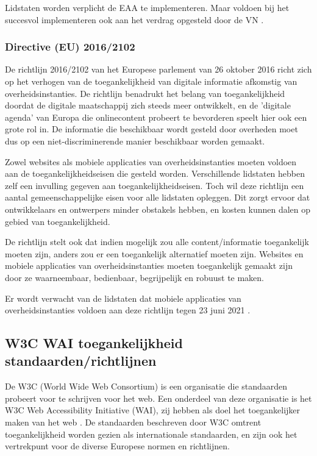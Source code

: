 Lidstaten worden verplicht de EAA te implementeren. Maar voldoen bij het succesvol implementeren ook aan het verdrag opgesteld door de VN \autocite{eaa2015}.



\subsubsection{Directive (EU) 2016/2102}
De richtlijn 2016/2102 van het Europese parlement van 26 oktober 2016 richt zich op het verhogen van de toegankelijkheid van digitale informatie afkomstig van overheidsinstanties. De richtlijn benadrukt het belang van toegankelijkheid doordat de digitale maatschappij zich steeds meer ontwikkelt, en de 'digitale agenda' van Europa die onlinecontent probeert te bevorderen speelt hier ook een grote rol in. De informatie die beschikbaar wordt gesteld door overheden moet dus op een niet-discriminerende manier beschikbaar worden gemaakt. 

Zowel websites als mobiele applicaties van overheidsinstanties moeten voldoen aan de toegankelijkheidseisen die gesteld worden. Verschillende lidstaten hebben zelf een invulling gegeven aan toegankelijkheidseisen. Toch wil deze richtlijn een aantal gemeenschappelijke eisen voor alle lidstaten opleggen. Dit zorgt ervoor dat ontwikkelaars en ontwerpers minder obstakels hebben, en kosten kunnen dalen op gebied van toegankelijkheid.

De richtlijn stelt ook dat indien mogelijk zou alle content/informatie toegankelijk moeten zijn, anders zou er een toegankelijk alternatief moeten zijn. Websites en mobiele applicaties van overheidsinstanties moeten toegankelijk gemaakt zijn door ze waarneembaar, bedienbaar, begrijpelijk en robuust te maken.
 
Er wordt verwacht van de lidstaten dat mobiele applicaties van overheidsinstanties voldoen aan deze richtlijn tegen 23 juni 2021 \autocite{directive2016}.

\subsection{W3C WAI toegankelijkheid standaarden/richtlijnen}
\label{sec:standaarden}
De W3C (World Wide Web Consortium) is een organisatie die standaarden probeert voor te schrijven voor het web. Een onderdeel van deze organisatie is het W3C Web Accessibility Initiative (WAI), zij hebben als doel het toegankelijker maken van het web
 \autocite{introAccesibilityw3c}. De standaarden beschreven door W3C omtrent toegankelijkheid worden gezien als internationale standaarden, en zijn ook het vertrekpunt voor de diverse Europese normen en richtlijnen.
 

